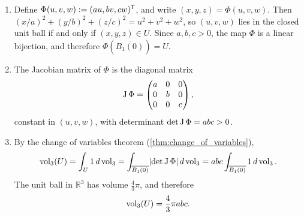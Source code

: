 \begin{exercisesolution}
\label{sol:volume_ellipsoid_change_variables}
\begin{enumerate}[label=\textbf{(\alph*)}]
  \item Define $\Phi(u,v,w) := (au, bv, cw)^{\mathsf{T}}$, and write $(x,y,z) = \Phi(u,v,w)$. Then
    $(x/a)^2 + (y/b)^2 + (z/c)^2 = u^2+v^2+w^2$, so $(u,v,w)$ lies in the closed unit ball if and
    only if $(x,y,z) \in U$. Since $a,b,c > 0$, the map $\Phi$ is a linear bijection, and therefore
    $\Phi(\overline{B_1(0)}) = U$.

  \item The Jacobian matrix of $\Phi$ is the diagonal matrix
\[\operatorname{J}\Phi = \begin{pmatrix} a & 0 & 0 \\ 0 & b & 0 \\ 0 & 0 & c \end{pmatrix},\]
    constant in $(u,v,w)$, with determinant $\det \operatorname{J}\Phi = abc > 0$.

  \item By the change of variables theorem (\cref{thm:change_of_variables}),
\[\operatorname{vol}_3(U) = \int_U 1 \, d\operatorname{vol}_3 = \int_{\overline{B_1(0)}} \lvert\det \operatorname{J}\Phi\rvert \, d\operatorname{vol}_3 = abc \int_{\overline{B_1(0)}} 1 \, d\operatorname{vol}_3 .\]
The unit ball in $\mathbb{R}^3$ has volume $\tfrac{4}{3}\pi$, and therefore
\[\operatorname{vol}_3(U) = \frac{4}{3} \pi abc.\]
\end{enumerate}
\end{exercisesolution}

